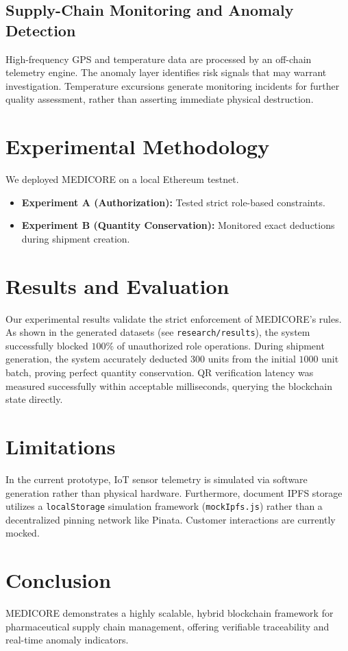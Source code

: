 \documentclass[runningheads]{llncs}
\begin{document}
\subsection{Supply-Chain Monitoring and Anomaly Detection}
High-frequency GPS and temperature data are processed by an off-chain telemetry engine. The anomaly layer identifies risk signals that may warrant investigation. Temperature excursions generate monitoring incidents for further quality assessment, rather than asserting immediate physical destruction.

\section{Experimental Methodology}
We deployed MEDICORE on a local Ethereum testnet.
\begin{itemize}
    \item \textbf{Experiment A (Authorization):} Tested strict role-based constraints.
    \item \textbf{Experiment B (Quantity Conservation):} Monitored exact deductions during shipment creation.
\end{itemize}

\section{Results and Evaluation}
Our experimental results validate the strict enforcement of MEDICORE's rules. As shown in the generated datasets (see \texttt{research/results}), the system successfully blocked $100\%$ of unauthorized role operations. During shipment generation, the system accurately deducted $300$ units from the initial $1000$ unit batch, proving perfect quantity conservation. QR verification latency was measured successfully within acceptable milliseconds, querying the blockchain state directly.

\section{Limitations}
In the current prototype, IoT sensor telemetry is simulated via software generation rather than physical hardware. Furthermore, document IPFS storage utilizes a \texttt{localStorage} simulation framework (\texttt{mockIpfs.js}) rather than a decentralized pinning network like Pinata. Customer interactions are currently mocked.

\section{Conclusion}
MEDICORE demonstrates a highly scalable, hybrid blockchain framework for pharmaceutical supply chain management, offering verifiable traceability and real-time anomaly indicators.
\end{document}
